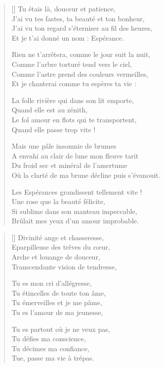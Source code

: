\settowidth{\versewidth}{Où la clarté de ma brune décline puis s'évanouit.}
\begin{verse}[\versewidth]
Tu étais là, douceur et patience, \\
J'ai vu tes fastes, ta beauté et ton bonheur, \\
J'ai vu ton regard s'éterniser au fil des heures, \\
Et je t'ai donné un nom : Espérance.

Rien ne t'arrêtera, comme le jour suit la nuit, \\
Comme l'arbre torturé tend vers le ciel, \\
Comme l'astre prend des couleurs vermeilles, \\
Et je chanterai comme tu espères ta vie :

La folle rivière qui dans son lit emporte, \\
Quand elle est au zénith, \\
Le fol amour en flots qui te transportent, \\
Quand elle passe trop vite !


Mais une pâle insomnie de brumes \\
A envahi au clair de lune mon fleuve tarit \\
Du froid sec et minéral de l'amertume \\
Où la clarté de ma brune décline puis s'évanouit.

Les Espérances grandissent tellement vite ! \\
Une rose que la beauté félicite, \\
Si sublime dans son manteau impeccable, \\
Brûlait mes yeux d'un amour improbable.
\end{verse}

\newpage

\settowidth{\versewidth}{Transcendante vision de tendresse,}
\begin{verse}[\versewidth]
Divinité ange et chasseresse, \\
Eparpilleuse des trêves du cœur, \\
Arche et louange de douceur, \\
Transcendante vision de tendresse,

Tu es mon cri d'allégresse, \\
Tu étincelles de toute ton âme, \\
Tu émerveilles et je me pâme, \\
Tu es l'amour de ma jeunesse,

Tu es partout où je ne veux pas, \\
Tu défies ma conscience, \\
Tu décimes ma confiance, \\
Tue, passe ma vie à trépas.
\end{verse}

